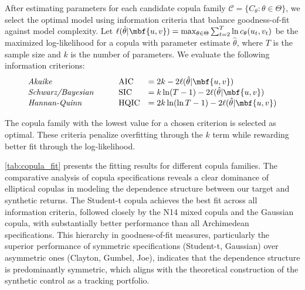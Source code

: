 After estimating parameters for each candidate copula family $\mathcal{C} = \{C_\theta : \theta \in \Theta\}$, we select the optimal model using information criteria that balance goodness-of-fit against model complexity. Let $\ell(\hat{\theta}|\mbf {u,v}) = \max_{\theta\in\Theta} \sum_{t=2}^T \ln c_{{\theta}}(u_t, v_t)$ be the maximized log-likelihood for a copula with parameter estimate $\hat{\theta}$, where $T$ is the sample size and $k$ is the number of parameters. We evaluate the following information criterions:
$$
\begin{array}{lllll}
\text{\textit{Akaike}} &&& \text{AIC} &= 2k - 2
\ell(\hat{\theta}|\mbf {u,v})
\\
\text{\textit{Schwarz/Bayesian}} &&& \text{SIC} &= k\ln(T-1) - 2
\ell(\hat{\theta}|\mbf {u,v})
\\
\text{\textit{Hannan-Quinn}} &&& \text{HQIC} &= 2k\ln(\ln T-1) - 2
\ell(\hat{\theta}|\mbf {u,v})
\end{array}
$$

The copula family with the lowest value for a chosen criterion is selected as optimal. These criteria penalize overfitting through the $k$ term while rewarding better fit through the log-likelihood.





\cref{tab:copula_fit} presents the fitting results for different copula families.  The comparative analysis of copula specifications reveals a clear dominance of elliptical copulas in modeling the dependence structure between  our target and synthetic returns. The Student-t copula achieves the best fit across all information criteria, %
followed closely by the N14 mixed copula and the Gaussian copula, with substantially better performance than all Archimedean specifications. This hierarchy in goodness-of-fit measures, particularly the superior performance of symmetric specifications (Student-t, Gaussian) over asymmetric ones (Clayton, Gumbel, Joe), indicates that the dependence structure is predominantly symmetric, which aligns with the theoretical construction of the synthetic control as a tracking portfolio.

